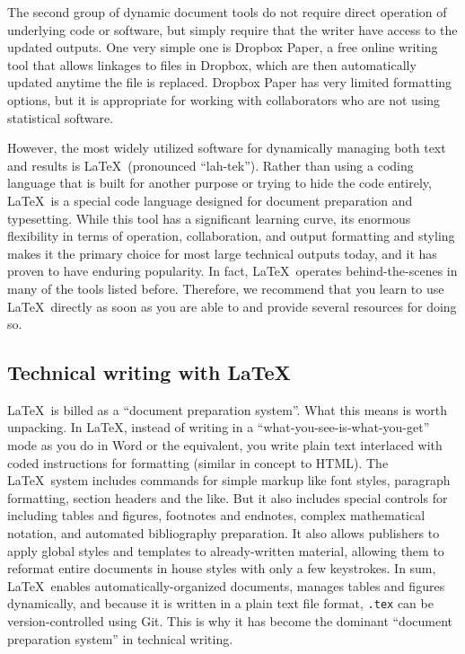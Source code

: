 The second group of dynamic document tools do not require
direct operation of underlying code or software, but simply require
that the writer have access to the updated outputs.
One very simple one is Dropbox Paper, a free online writing tool
that allows linkages to files in Dropbox,
which are then automatically updated anytime the file is replaced.
Dropbox Paper has very limited formatting options,
but it is appropriate for working with collaborators who are not using statistical software.

However, the most widely utilized software
for dynamically managing both text and results is \LaTeX\ (pronounced ``lah-tek'').
  \index{\LaTeX}
Rather than using a coding language that is built for another purpose
or trying to hide the code entirely,
\LaTeX\ is a special code language designed for document preparation and typesetting.
While this tool has a significant learning curve,
its enormous flexibility in terms of operation, collaboration,
and output formatting and styling
makes it the primary choice for most large technical outputs today,
and it has proven to have enduring popularity.
In fact, \LaTeX\ operates behind-the-scenes in many of the tools listed before.
Therefore, we recommend that you learn to use \LaTeX\ directly
as soon as you are able to and provide several resources for doing so.

\subsection{Technical writing with \LaTeX}

\LaTeX\ is billed as a ``document preparation system''.
What this means is worth unpacking.
In {\LaTeX}, instead of writing in a ``what-you-see-is-what-you-get'' mode
as you do in Word or the equivalent,
you write plain text interlaced with coded instructions for formatting
(similar in concept to HTML).
The \LaTeX\ system includes commands for simple markup
like font styles, paragraph formatting, section headers and the like.
But it also includes special controls for including tables and figures,
footnotes and endnotes, complex mathematical notation, and automated bibliography preparation.
It also allows publishers to apply global styles and templates
to already-written material, allowing them to reformat entire documents in house styles
with only a few keystrokes.
In sum, \LaTeX\ enables automatically-organized documents,
manages tables and figures dynamically,
and because it is written in a plain text file format,
\texttt{.tex} can be version-controlled using Git.
This is why it has become the dominant ``document preparation system'' in technical writing.

